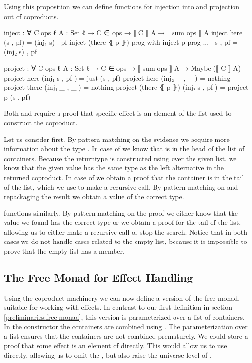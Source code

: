 Using this proposition we can define functions for injection into and projection
out of coproducts.

\begin{code}
inject : ∀ {C ops ℓ} {A : Set ℓ} → C ∈ ops → ⟦ C ⟧ A → ⟦ sum ops ⟧ A
inject here           (s , pf)  = (inj₁ s) , pf
inject (there ⦃ p ⦄)  prog      with inject p prog
... | s , pf = (inj₂ s) , pf

project : ∀ {C ops ℓ} {A : Set ℓ} → C ∈ ops → ⟦ sum ops ⟧ A → Maybe (⟦ C ⟧ A)
project here           (inj₁ s  , pf  )  = just (s , pf)
project here           (inj₂ _  , _   )  = nothing
project there          (inj₁ _  , _   )  = nothing
project (there ⦃ p ⦄)  (inj₂ s  , pf  )  = project p (s , pf)
\end{code}
Both  and  require a proof that
specific effect is an element of the list used to construct the coproduct.

Let us consider  first.
By pattern matching on the evidence we acquire more information about the type
\AgdaSpace{}.
In case of  we know that  is in
the head of the list of containers.
Because the returntype is constructed using  over the given
list, we know that the given value
\AgdaSpace{}\AgdaInductiveConstructor{,}\AgdaSpace{}
has the same type as the left alternative in the returned coproduct.
In case of  we obtain a proof that the container
is in the tail of the list, which we use to make a recursive call.
By pattern matching on and repackaging the result we obtain a value of the
correct type.

 functions similarly.
By pattern matching on the proof we either know that the value we found has
the correct type or we obtain a proof for the tail of the list, allowing us to
either make a recursive call or stop the search.
Notice that in both cases we do not handle cases related to the empty list,
because it is impossible to prove that the empty list has a member.


\subsection{The Free Monad for Effect Handling}
\label{first-order:free-monad}

Using the coproduct machinery we can now define a version of the free monad,
suitable for working with effects.
In contrast to our first definition in section \ref{preliminaries:free-monad},
this version is parameterized over a list of containers.
In the  constructor the containers are combined
using .
The parameterization over a list ensures that the containers are not combined
prematurely.
We could store a proof that some effect  is an element of
 directly.
This would allow us to use  directly, allowing us to omit the
, but also raise the universe level of .

